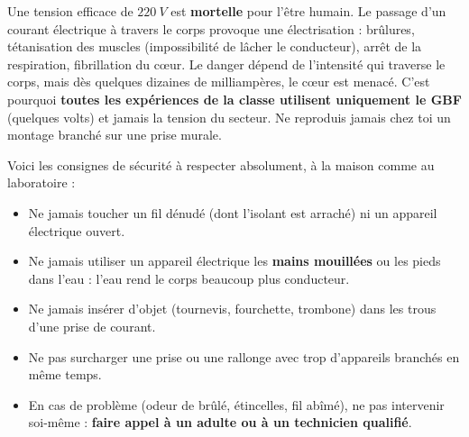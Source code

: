 \documentclass[11pt]{article}
\newcommand{\cle}[1]{{\popxbold\color{popdark}#1}}
\begin{document}
\begin{attention}
Une tension efficace de $\SI{220}{V}$ est \textbf{mortelle} pour l'être humain. Le passage d'un courant électrique à travers le corps provoque une \cle{électrisation} : brûlures, tétanisation des muscles (impossibilité de lâcher le conducteur), arrêt de la respiration, fibrillation du cœur. Le danger dépend de l'intensité qui traverse le corps, mais dès quelques dizaines de milliampères, le cœur est menacé. C'est pourquoi \textbf{toutes les expériences de la classe utilisent uniquement le GBF} (quelques volts) et jamais la tension du secteur. Ne reproduis jamais chez toi un montage branché sur une prise murale.
\end{attention}

Voici les consignes de sécurité à respecter absolument, à la maison comme au laboratoire :

\begin{aretenir}
\begin{itemize}
\item Ne jamais toucher un fil \cle{dénudé} (dont l'isolant est arraché) ni un appareil électrique ouvert.
\item Ne jamais utiliser un appareil électrique les \textbf{mains mouillées} ou les pieds dans l'eau : l'eau rend le corps beaucoup plus conducteur.
\item Ne jamais insérer d'objet (tournevis, fourchette, trombone) dans les trous d'une prise de courant.
\item Ne pas surcharger une prise ou une rallonge avec trop d'appareils branchés en même temps.
\item En cas de problème (odeur de brûlé, étincelles, fil abîmé), ne pas intervenir soi-même : \textbf{faire appel à un adulte ou à un technicien qualifié}.
\end{itemize}
\end{aretenir}
\end{document}
